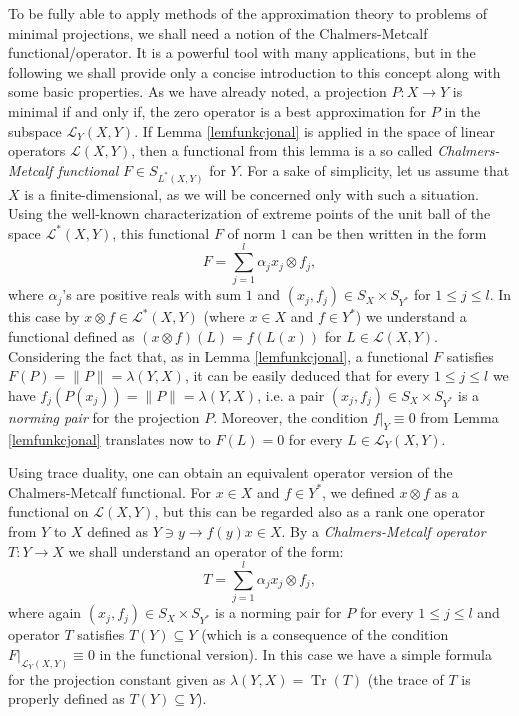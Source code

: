 \documentclass[12pt, reqno]{amsart}
\theoremstyle{definition}
\theoremstyle{remark}
\numberwithin{equation}{section}
\DeclareMathOperator{\tr}{Tr}
\begin{document}
To be fully able to apply methods of the approximation theory to problems of minimal projections, we shall need a notion of the Chalmers-Metcalf functional/operator. It is a powerful tool with many applications, but in the following we shall provide only a concise introduction to this concept along with some basic properties. As we have already noted, a projection $P: X \to Y$ is minimal if and only if, the zero operator is a best approximation for $P$ in the subspace $\mathcal{L}_Y(X, Y)$. If Lemma \ref{lemfunkcjonal} is applied in the space of linear operators $\mathcal{L}(X, Y)$, then a functional from this lemma is a so called \emph{Chalmers-Metcalf functional} $F \in S_{L^*(X, Y)}$ for $Y$. For a sake of simplicity, let us assume that $X$ is a finite-dimensional, as we will be concerned only with such a situation. Using the well-known characterization of extreme points of the unit ball of the space $\mathcal{L}^*(X, Y)$, this functional $F$ of norm $1$ can be then written in the form
$$F = \sum_{j=1}^{l} \alpha_j x_j \otimes f_j,$$
where $\alpha_j$'s are positive reals with sum $1$ and $(x_j, f_j) \in S_{X} \times S_{Y^*}$ for $1 \leq j \leq l$. In this case by $x \otimes f \in \mathcal{L}^*(X, Y)$ (where $x \in X$ and $f \in Y^*$) we understand a functional defined as $(x \otimes f)(L) = f(L(x))$ for $L \in \mathcal{L}(X, Y)$. Considering the fact that, as in Lemma \ref{lemfunkcjonal}, a functional $F$ satisfies $F(P)=\|P\|=\lambda(Y, X)$, it can be easily deduced that for every $1 \leq j \leq l$ we have $f_j(P(x_j))=\|P\|=\lambda(Y, X)$, i.e. a pair $(x_j, f_j) \in S_{X} \times S_{Y^*}$ is a \emph{norming pair} for the projection $P$. Moreover, the condition $f|_Y \equiv 0$ from Lemma \ref{lemfunkcjonal} translates now to $F(L)=0$ for every $L \in \mathcal{L}_Y(X, Y)$.

Using trace duality, one can obtain an equivalent operator version of the Chalmers-Metcalf functional. For $x \in X$ and $f \in Y^*$, we defined $x \otimes f$ as a functional on $\mathcal{L}(X, Y)$, but this can be regarded also as a rank one operator from $Y$ to $X$ defined as $Y \ni y \to f(y)x \in X$. By a \emph{Chalmers-Metcalf operator} $T: Y \to X$ we shall understand an operator of the form:
$$T = \sum_{j=1}^{l} \alpha_j x_j \otimes f_j,$$
where again $(x_j, f_j) \in S_{X} \times S_{Y^*}$ is a norming pair for $P$ for every $1 \leq j \leq l$ and operator $T$ satisfies $T(Y) \subseteq Y$ (which is a consequence of the condition $F|_{\mathcal{L}_Y(X, Y)} \equiv 0$ in the functional version). In this case we have a simple formula for the projection constant given as $\lambda(Y, X) = \tr(T)$ (the trace of $T$ is properly defined as $T(Y) \subseteq Y$).
\end{document}
